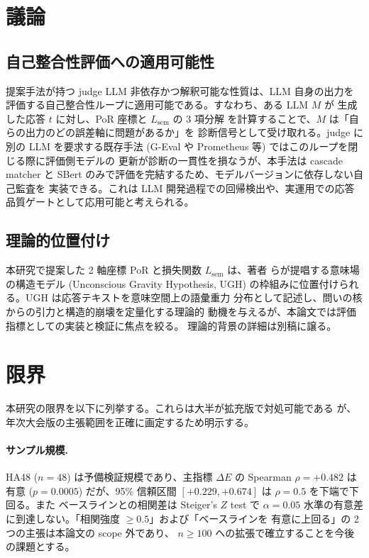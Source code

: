 
\section{議論}
\label{sec:discussion}

\subsection{自己整合性評価への適用可能性}
\label{sec:disc:self_audit}

提案手法が持つ judge LLM 非依存かつ解釈可能な性質は、LLM 自身の出力を
評価する自己整合性ループに適用可能である。すなわち、ある LLM $M$ が
生成した応答 $t$ に対し、PoR 座標と $L_{\mathrm{sem}}$ の 3 項分解
を計算することで、$M$ は「自らの出力のどの誤差軸に問題があるか」を
診断信号として受け取れる。judge に別の LLM を要求する既存手法
(G-Eval や Prometheus 等) ではこのループを閉じる際に評価側モデルの
更新が診断の一貫性を損なうが、本手法は cascade matcher と SBert
のみで評価を完結するため、モデルバージョンに依存しない自己監査を
実装できる。これは LLM 開発過程での回帰検出や、実運用での応答
品質ゲートとして応用可能と考えられる。

\subsection{理論的位置付け}
\label{sec:disc:theoretical}

本研究で提案した 2 軸座標 PoR と損失関数 $L_{\mathrm{sem}}$ は、著者
らが提唱する意味場の構造モデル (Unconscious Gravity Hypothesis, UGH)
の枠組みに位置付けられる。UGH は応答テキストを意味空間上の語彙重力
分布として記述し、問いの核からの引力と構造的崩壊を定量化する理論的
動機を与えるが、本論文では評価指標としての実装と検証に焦点を絞る。
理論的背景の詳細は別稿に譲る。

\section{限界}
\label{sec:limitations}

本研究の限界を以下に列挙する。これらは大半が拡充版で対処可能である
が、年次大会版の主張範囲を正確に画定するため明示する。

\paragraph{サンプル規模.}
HA48 ($n = 48$) は予備検証規模であり、主指標 $\Delta E$ の Spearman
$\rho = +0.482$ は有意 ($p = 0.0005$) だが、95\% 信頼区間
$[+0.229, +0.674]$ は $\rho = 0.5$ を下端で下回る。また
ベースラインとの相関差は Steiger's $Z$ test で $\alpha = 0.05$
水準の有意差に到達しない。「相関強度 $\geq 0.5$」および「ベースラインを
有意に上回る」の 2 つの主張は本論文の scope 外であり、
$n \geq 100$ への拡張で確立することを今後の課題とする。

